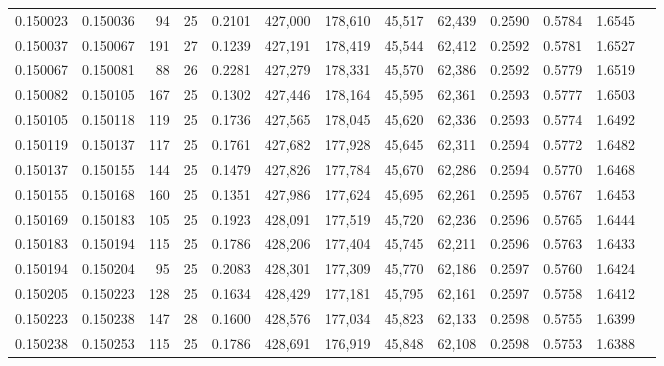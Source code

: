 \begin{tabular}{rrrrrrrrrrrrr}
0.150023 & 0.150036 &    94 &  25 &                                     0.2101 & 427,000 & 178,610 &  45,517 &  62,439 & 0.2590 & 0.5784 & 1.6545 \\
0.150037 & 0.150067 &   191 &  27 &                                     0.1239 & 427,191 & 178,419 &  45,544 &  62,412 & 0.2592 & 0.5781 & 1.6527 \\
0.150067 & 0.150081 &    88 &  26 &                                     0.2281 & 427,279 & 178,331 &  45,570 &  62,386 & 0.2592 & 0.5779 & 1.6519 \\
0.150082 & 0.150105 &   167 &  25 &                                     0.1302 & 427,446 & 178,164 &  45,595 &  62,361 & 0.2593 & 0.5777 & 1.6503 \\
0.150105 & 0.150118 &   119 &  25 &                                     0.1736 & 427,565 & 178,045 &  45,620 &  62,336 & 0.2593 & 0.5774 & 1.6492 \\
0.150119 & 0.150137 &   117 &  25 &                                     0.1761 & 427,682 & 177,928 &  45,645 &  62,311 & 0.2594 & 0.5772 & 1.6482 \\
0.150137 & 0.150155 &   144 &  25 &                                     0.1479 & 427,826 & 177,784 &  45,670 &  62,286 & 0.2594 & 0.5770 & 1.6468 \\
0.150155 & 0.150168 &   160 &  25 &                                     0.1351 & 427,986 & 177,624 &  45,695 &  62,261 & 0.2595 & 0.5767 & 1.6453 \\
0.150169 & 0.150183 &   105 &  25 &                                     0.1923 & 428,091 & 177,519 &  45,720 &  62,236 & 0.2596 & 0.5765 & 1.6444 \\
0.150183 & 0.150194 &   115 &  25 &                                     0.1786 & 428,206 & 177,404 &  45,745 &  62,211 & 0.2596 & 0.5763 & 1.6433 \\
0.150194 & 0.150204 &    95 &  25 &                                     0.2083 & 428,301 & 177,309 &  45,770 &  62,186 & 0.2597 & 0.5760 & 1.6424 \\
0.150205 & 0.150223 &   128 &  25 &                                     0.1634 & 428,429 & 177,181 &  45,795 &  62,161 & 0.2597 & 0.5758 & 1.6412 \\
0.150223 & 0.150238 &   147 &  28 &                                     0.1600 & 428,576 & 177,034 &  45,823 &  62,133 & 0.2598 & 0.5755 & 1.6399 \\
0.150238 & 0.150253 &   115 &  25 &                                     0.1786 & 428,691 & 176,919 &  45,848 &  62,108 & 0.2598 & 0.5753 & 1.6388 \\

\end{tabular}
